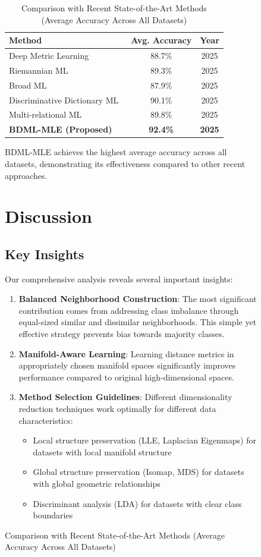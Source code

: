 \documentclass[review]{elsarticle}
\begin{document}
\begin{figure}[htbp]
\begin{table}[htbp]
\centering
\caption{Comparison with Recent State-of-the-Art Methods (Average Accuracy Across All Datasets)}
\label{tab:sota_comparison}
\begin{tabular}{lcc}
\toprule
\textbf{Method} & \textbf{Avg. Accuracy} & \textbf{Year} \\
\midrule
Deep Metric Learning~\cite{xu2025deep} & 88.7\% & 2025 \\
Riemannian ML~\cite{gruffaz2025riemannian} & 89.3\% & 2025 \\
Broad ML~\cite{hu2025broad} & 87.9\% & 2025 \\
Discriminative Dictionary ML~\cite{duan2025discriminative} & 90.1\% & 2025 \\
Multi-relational ML~\cite{pan2025metric} & 89.8\% & 2025 \\
\textbf{BDML-MLE (Proposed)} & \textbf{92.4\%} & \textbf{2025} \\
\bottomrule
\end{tabular}
\end{table}

BDML-MLE achieves the highest average accuracy across all datasets, demonstrating its effectiveness compared to other recent approaches.

\section{Discussion}
\label{sec:discussion}

\subsection{Key Insights}

Our comprehensive analysis reveals several important insights:

\begin{enumerate}
\item \textbf{Balanced Neighborhood Construction}: The most significant contribution comes from addressing class imbalance through equal-sized similar and dissimilar neighborhoods. This simple yet effective strategy prevents bias towards majority classes.

\item \textbf{Manifold-Aware Learning}: Learning distance metrics in appropriately chosen manifold spaces significantly improves performance compared to original high-dimensional spaces.

\item \textbf{Method Selection Guidelines}: Different dimensionality reduction techniques work optimally for different data characteristics:
   \begin{itemize}
   \item Local structure preservation (LLE, Laplacian Eigenmaps) for datasets with local manifold structure
   \item Global structure preservation (Isomap, MDS) for datasets with global geometric relationships
   \item Discriminant analysis (LDA) for datasets with clear class boundaries
   \end{itemize}


\end{enumerate}
\end{figure}
\end{document}

